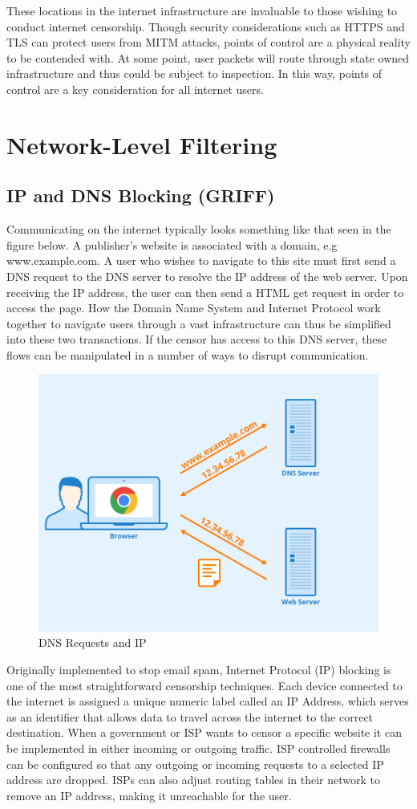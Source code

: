 These locations in the internet infrastructure are invaluable to those wishing to conduct internet censorship. Though security considerations such as HTTPS and TLS can protect users from MITM attacks, points of control are a physical reality to be contended with. At some point, user packets will route through state owned infrastructure and thus could be subject to inspection. In this way, points of control are a key consideration for all internet users. 


\section{Network-Level Filtering }
\subsection{IP and DNS Blocking (GRIFF)}
Communicating on the internet typically looks something like that seen in the figure below. A publisher's website is associated with a domain, e.g www.example.com. A user who wishes to navigate to this site must first send a DNS request to the DNS server to resolve the IP address of the web server. Upon receiving the IP address, the user can then send a HTML get request in order to access the page. How the Domain Name System and Internet Protocol work together to navigate users through a vast infrastructure can thus be simplified into these two transactions. If the censor has access to this DNS server, these flows can be manipulated in a number of ways to disrupt communication.

\begin{figure}
    \centering
    \includegraphics[width=0.5\linewidth]{State of the Art/DNS.png}
    \caption{DNS Requests and IP}
    \label{fig:enter-label}
\end{figure}
 

Originally implemented to stop email spam, Internet Protocol (IP) blocking is one of the most straightforward censorship techniques. Each device connected to the internet is assigned a unique numeric label called an IP Address, which serves as an identifier that allows data to travel across the internet to the correct destination. When a government or ISP wants to censor a specific website it can be implemented in either incoming or outgoing traffic. ISP controlled firewalls can be configured so that any outgoing or incoming requests to a selected IP address are dropped. ISPs can also adjust routing tables in their network to remove an IP address, making it unreachable for the user. 


